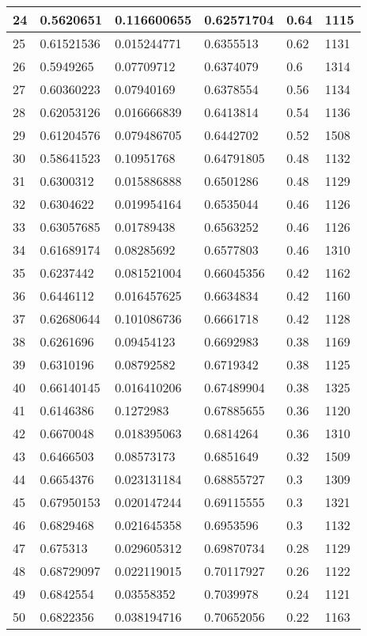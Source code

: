 \begin{longtable}{|l|l|l|l|l|l|}
24 & 0.5620651 & 0.116600655 & 0.62571704 & 0.64 & 1115 \\ \hline 
25 & 0.61521536 & 0.015244771 & 0.6355513 & 0.62 & 1131 \\ \hline 
26 & 0.5949265 & 0.07709712 & 0.6374079 & 0.6 & 1314 \\ \hline 
27 & 0.60360223 & 0.07940169 & 0.6378554 & 0.56 & 1134 \\ \hline 
28 & 0.62053126 & 0.016666839 & 0.6413814 & 0.54 & 1136 \\ \hline 
29 & 0.61204576 & 0.079486705 & 0.6442702 & 0.52 & 1508 \\ \hline 
30 & 0.58641523 & 0.10951768 & 0.64791805 & 0.48 & 1132 \\ \hline 
31 & 0.6300312 & 0.015886888 & 0.6501286 & 0.48 & 1129 \\ \hline 
32 & 0.6304622 & 0.019954164 & 0.6535044 & 0.46 & 1126 \\ \hline 
33 & 0.63057685 & 0.01789438 & 0.6563252 & 0.46 & 1126 \\ \hline 
34 & 0.61689174 & 0.08285692 & 0.6577803 & 0.46 & 1310 \\ \hline 
35 & 0.6237442 & 0.081521004 & 0.66045356 & 0.42 & 1162 \\ \hline 
36 & 0.6446112 & 0.016457625 & 0.6634834 & 0.42 & 1160 \\ \hline 
37 & 0.62680644 & 0.101086736 & 0.6661718 & 0.42 & 1128 \\ \hline 
38 & 0.6261696 & 0.09454123 & 0.6692983 & 0.38 & 1169 \\ \hline 
39 & 0.6310196 & 0.08792582 & 0.6719342 & 0.38 & 1125 \\ \hline 
40 & 0.66140145 & 0.016410206 & 0.67489904 & 0.38 & 1325 \\ \hline 
41 & 0.6146386 & 0.1272983 & 0.67885655 & 0.36 & 1120 \\ \hline 
42 & 0.6670048 & 0.018395063 & 0.6814264 & 0.36 & 1310 \\ \hline 
43 & 0.6466503 & 0.08573173 & 0.6851649 & 0.32 & 1509 \\ \hline 
44 & 0.6654376 & 0.023131184 & 0.68855727 & 0.3 & 1309 \\ \hline 
45 & 0.67950153 & 0.020147244 & 0.69115555 & 0.3 & 1321 \\ \hline 
46 & 0.6829468 & 0.021645358 & 0.6953596 & 0.3 & 1132 \\ \hline 
47 & 0.675313 & 0.029605312 & 0.69870734 & 0.28 & 1129 \\ \hline 
48 & 0.68729097 & 0.022119015 & 0.70117927 & 0.26 & 1122 \\ \hline 
49 & 0.6842554 & 0.03558352 & 0.7039978 & 0.24 & 1121 \\ \hline 
50 & 0.6822356 & 0.038194716 & 0.70652056 & 0.22 & 1163 \\ \hline 
\end{longtable}